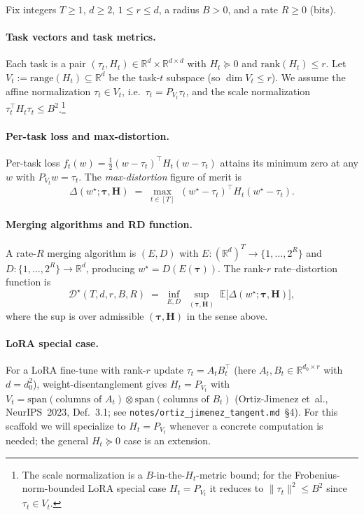 \documentclass{article}
\theoremstyle{remark}
\newcommand{\R}{\mathbb{R}}
\newcommand{\E}{\mathbb{E}}
\newcommand{\rank}{\mathrm{rank}}
\newcommand{\range}{\mathrm{range}}
\begin{document}
Fix integers $T \geq 1$, $d \geq 2$, $1 \leq r \leq d$, a radius
$B > 0$, and a rate $R \geq 0$ (bits).

\paragraph{Task vectors and task metrics.} Each task is a pair
$(\tau_t, H_t) \in \R^d \times \R^{d\times d}$ with $H_t \succeq 0$ and
$\rank(H_t) \leq r$. Let $V_t := \range(H_t) \subseteq \R^d$ be the
task-$t$ subspace (so $\dim V_t \leq r$). We assume the affine
normalization $\tau_t \in V_t$, i.e.\ $\tau_t = P_{V_t}\tau_t$, and
the scale normalization $\tau_t^\top H_t \tau_t \leq B^2$.\footnote{%
  The scale normalization is a $B$-in-the-$H_t$-metric bound;
  for the Frobenius-norm-bounded LoRA special case $H_t = P_{V_t}$
  it reduces to $\|\tau_t\|^2 \leq B^2$ since
  $\tau_t\in V_t$.}

\paragraph{Per-task loss and max-distortion.} Per-task loss
$f_t(w) = \tfrac12 (w-\tau_t)^\top H_t (w-\tau_t)$ attains its minimum
zero at any $w$ with $P_{V_t} w = \tau_t$. The \emph{max-distortion}
figure of merit is
\[
  \Delta(w^\star; \boldsymbol\tau, \boldsymbol H)
  \;=\; \max_{t\in[T]}\; (w^\star - \tau_t)^\top H_t (w^\star - \tau_t).
\]

\paragraph{Merging algorithms and RD function.} A rate-$R$ merging
algorithm is $(E,D)$ with $E:(\R^d)^T\to\{1,\dots,2^R\}$ and
$D:\{1,\dots,2^R\}\to\R^d$, producing $w^\star = D(E(\boldsymbol\tau))$.
The rank-$r$ rate--distortion function is
\begin{equation}\label{eq:rd-def-rankr}
  \mathcal{D}^\star(T, d, r, B, R)
  \;=\; \inf_{E,D}\;\sup_{(\boldsymbol\tau, \boldsymbol H)}\;
  \E\bigl[\Delta(w^\star;\boldsymbol\tau,\boldsymbol H)\bigr],
\end{equation}
where the sup is over admissible $(\boldsymbol\tau, \boldsymbol H)$
in the sense above.

\paragraph{LoRA special case.} For a LoRA fine-tune with rank-$r$
update $\tau_t = A_t B_t^\top$ (here $A_t, B_t \in \R^{d_0\times r}$
with $d = d_0^2$), weight-disentanglement gives $H_t = P_{V_t}$
with $V_t = \mathrm{span}(\text{columns of }A_t)\otimes\mathrm{span}
(\text{columns of }B_t)$ (Ortiz-Jimenez et~al., NeurIPS~2023, Def.\ 3.1;
see \texttt{notes/ortiz\_jimenez\_tangent.md}~\S4). For this scaffold
we will specialize to $H_t = P_{V_t}$ whenever a concrete computation
is needed; the general $H_t \succeq 0$ case is an extension.
\end{document}
